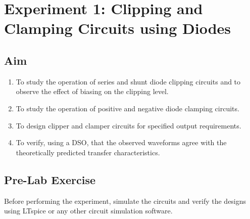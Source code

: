 %

\chapter{Experiment 1: Clipping and Clamping Circuits using Diodes}
\label{sec:expt1}

\section{Aim}
\begin{enumerate}[label=(\roman*)]
	\item To study the operation of series and shunt diode clipping circuits and to observe the effect of biasing on the clipping level.
	\item To study the operation of positive and negative diode clamping circuits.
	\item To design clipper and clamper circuits for specified output requirements.
	\item To verify, using a DSO, that the observed waveforms agree with the theoretically predicted transfer characteristics.
\end{enumerate}
\section{Pre-Lab Exercise}
Before performing the experiment, simulate the circuits and verify the designs using LTspice or any other circuit simulation software. 
